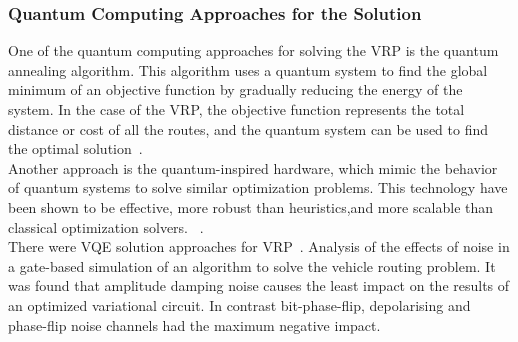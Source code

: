 \subsubsection{Quantum Computing Approaches for the Solution}
One of the quantum computing approaches for solving the VRP is the quantum annealing algorithm.
This algorithm uses a quantum system to find the global minimum of an objective function by gradually reducing the
energy of the system. In the case of the VRP, the objective function represents the total distance or cost of all
the routes, and the quantum system can be used to find the optimal solution~\cite{borowski2020new}.\\

Another approach is the quantum-inspired hardware, which mimic the behavior of quantum systems to solve
similar optimization problems.
This technology have been shown to be effective, more robust than
heuristics,and more scalable than classical optimization solvers. ~\cite{9605345}.\\

There were VQE solution approaches for VRP~\cite{mohanty2022analysis}.
Analysis of the effects of noise in a gate-based
simulation of an algorithm to solve the vehicle routing problem.
It was found that amplitude damping
noise causes the least impact on the results of an optimized
variational circuit. In contrast bit-phase-flip, depolarising and
phase-flip noise channels had the maximum negative impact.



